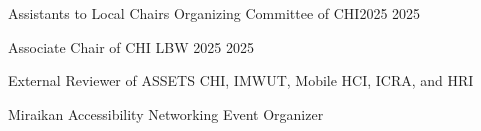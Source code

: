 

\begin{cvhonors}

  \cvhonor
    {Assistants to Local Chairs}
    {Organizing Committee of CHI2025}
    {}
    {2025}

  \cvhonor
    {Associate Chair of CHI LBW 2025}
    {}
    {}
    {2025}

  \cvhonor
    {External Reviewer of ASSETS}
    {CHI, IMWUT, Mobile HCI, ICRA, and HRI}
    {}
    {}

  \cvhonor
    {Miraikan Accessibility Networking Event Organizer}
    {}
    {}
    {}

\end{cvhonors}
